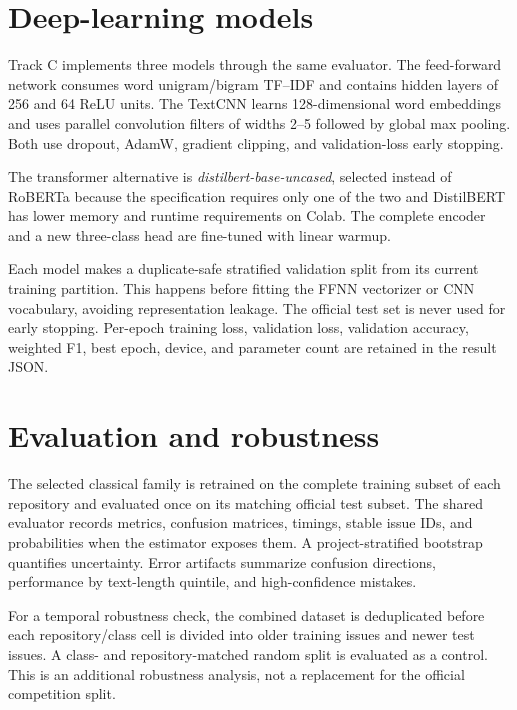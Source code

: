 \documentclass[11pt,a4paper]{article}
\begin{document}
\section{Deep-learning models}
Track C implements three models through the same evaluator. The feed-forward
network consumes word unigram/bigram TF--IDF and contains hidden layers of 256
and 64 ReLU units. The TextCNN learns 128-dimensional word embeddings and uses
parallel convolution filters of widths 2--5 followed by global max pooling.
Both use dropout, AdamW, gradient clipping, and validation-loss early stopping.

The transformer alternative is \emph{distilbert-base-uncased}, selected instead
of RoBERTa because the specification requires only one of the two and
DistilBERT has lower memory and runtime requirements on Colab. The complete
encoder and a new three-class head are fine-tuned with linear warmup.

Each model makes a duplicate-safe stratified validation split from its current
training partition. This happens before fitting the FFNN vectorizer or CNN
vocabulary, avoiding representation leakage. The official test set is never
used for early stopping. Per-epoch training loss, validation loss, validation
accuracy, weighted F1, best epoch, device, and parameter count are retained in
the result JSON.


\section{Evaluation and robustness}
The selected classical family is retrained on the complete training subset of
each repository and evaluated once on its matching official test subset. The shared
evaluator records metrics, confusion matrices, timings, stable issue IDs, and
probabilities when the estimator exposes them. A project-stratified bootstrap
quantifies uncertainty. Error artifacts summarize confusion directions,
performance by text-length quintile, and high-confidence mistakes.

For a temporal robustness check, the combined dataset is deduplicated before
each repository/class cell is divided into older training issues and newer test
issues. A class- and repository-matched random split is evaluated as a control.
This is an additional robustness analysis, not a replacement for the official
competition split.
\end{document}
